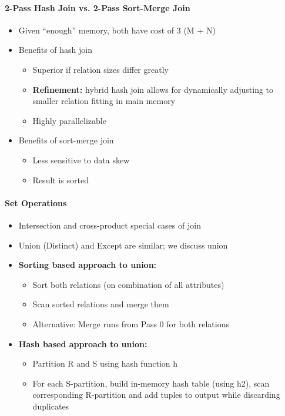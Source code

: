 \paragraph{2-Pass Hash Join vs. 2-Pass Sort-Merge Join}
\begin{itemize}
\item Given ``enough'' memory, both have cost of
  3 (M + N)

\item Benefits of hash join
  \begin{itemize}
  \item Superior if relation sizes differ greatly
  \item \textbf{Refinement:} hybrid hash join allows for dynamically
    adjusting to smaller relation fitting in main memory
  \item Highly parallelizable
  \end{itemize}

\item Benefits of sort-merge join
  \begin{itemize}
  \item Less sensitive to data skew
  \item Result is sorted
  \end{itemize}
\end{itemize}


\paragraph{Set Operations}
\begin{itemize}
\item Intersection and cross-product special cases of join
\item Union (Distinct) and Except are similar; we discuss union
\end{itemize}

\begin{itemize}
\item \textbf{Sorting based approach to union:}
  \begin{itemize}
  \item Sort both relations (on combination of all attributes)
  \item Scan sorted relations and merge them
  \item Alternative: Merge runs from Pass 0 for both relations
  \end{itemize}

\item \textbf{Hash based approach to union:}
  \begin{itemize}
  \item Partition R and S using hash function h
  \item For each S-partition, build in-memory hash table
    (using h2), scan corresponding R-partition and add
    tuples to output while discarding duplicates
  \end{itemize}
\end{itemize}

